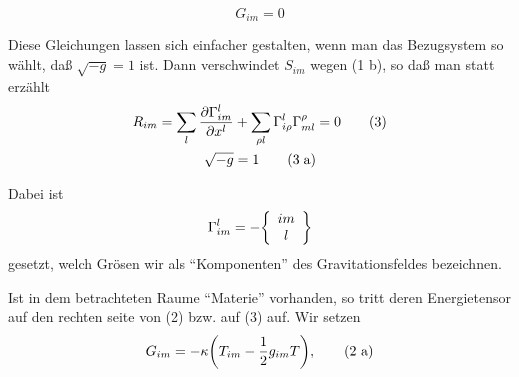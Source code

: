 \documentclass[10pt]{article}
\begin{document}
\begin{equation}
G_{im} = 0 \tag{2}
\end{equation}

Diese Gleichungen lassen sich einfacher gestalten, wenn man das Bezugsystem so w\"{a}hlt, da{\ss} $\sqrt{-g} =1$ ist. Dann verschwindet $S_{im}$ wegen (1 b), so da{\ss} man statt erz\"{a}hlt
\begin{align}
R_{im} = \sum_{l} \pdv{\Gamma^{l}_{im}}{x^l} &+ \sum_{\rho l} \Gamma^l_{i\rho} \Gamma^\rho_{ml} = 0 \tag{3} \\
\sqrt{-g} &= 1 \tag{3\;a}
\end{align}

Dabei ist
\begin{equation}
\Gamma^{l}_{im} = - \qty{\begin{array}{cc} im \\ l \end{array}}
\end{equation}
gesetzt, welch Gr\"{o}sen wir als ``Komponenten'' des Gravitationsfeldes bezeichnen.

Ist in dem betrachteten Raume ``Materie'' vorhanden, so tritt deren Energietensor auf den rechten seite von (2) bzw. auf (3) auf. Wir setzen
\begin{equation}
G_{im} = -\kappa\qty(T_{im} - \frac{1}{2}g_{im}T), \tag{2 a}
\end{equation}\\[1cm]
\end{document}
